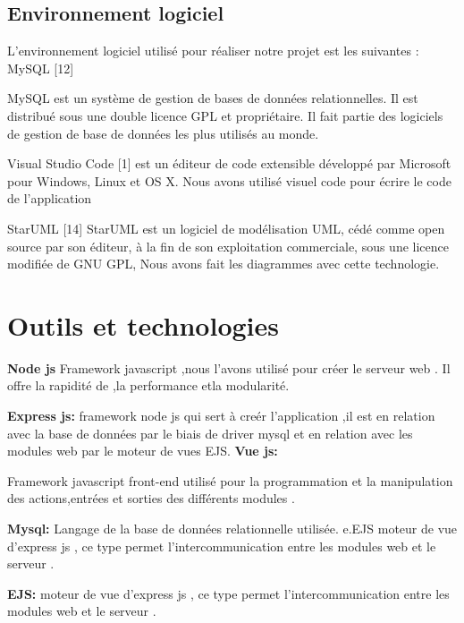   \subsection{Environnement logiciel}

L'environnement logiciel utilis\'{e} pour r\'{e}aliser notre projet est les suivantes :
\textbullet{} MySQL [12]

MySQL est un système de gestion de bases de données relationnelles. Il est distribué
sous une double licence GPL et propriétaire. Il fait partie des logiciels de gestion
de base de données les plus utilisés au monde.


\textbullet{} Visual Studio Code  [1]
est un \'{e}diteur de code extensible d\'{e}velopp\'{e} par Microsoft pour Windows,
Linux et OS X.
Nous avons utilis\'{e} visuel code pour \'{e}crire le code de l'application

\textbullet{}StarUML [14]
StarUML est un logiciel de mod\'{e}lisation UML, c\'{e}d\'{e} comme open source par son \'{e}diteur, \`{a} la
fin de son exploitation commerciale, sous une licence modifi\'{e}e de GNU GPL, Nous avons fait
les diagrammes avec cette technologie.





\section{Outils et technologies }
\textbf{ Node js}
Framework javascript ,nous l'avons utilis\'{e} pour cr\'{e}er le serveur web .
Il offre la rapidit\'{e} de ,la performance etla modularit\'{e}.
\bigskip


\textbf{ Express js:}
framework node js qui sert \`{a} cre\'{e}r l'application ,il est en
relation avec la base de donn\'{e}es par le biais de driver mysql et en relation
avec les modules web par le moteur de vues EJS.
\bigskip
\textbf{ Vue js:}

Framework javascript front-end utilis\'{e} pour la programmation et la
manipulation des actions,entr\'{e}es et sorties des diff\'{e}rents modules .
\bigskip

\textbf{ Mysql:}
Langage de la base de donn\'{e}es relationnelle utilis\'{e}e.
e.EJS moteur de vue d'express js , ce type permet l'intercommunication entre
les modules web et le serveur .
\bigskip

\textbf{ EJS:}
moteur de vue d'express js , ce type permet l'intercommunication entre
les modules web et le serveur .
\bigskip


